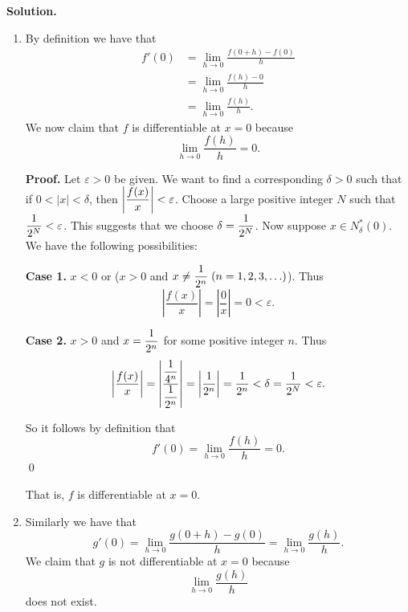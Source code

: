 \begin{enumerate}
      \textbf{Solution.}

      \begin{enumerate}
         \item By definition we have that
               \begin{align*}
                  f'(0) &= \lim_{h \to 0}\frac{f(0 + h) - f(0)}{h} \\
                        &= \lim_{h \to 0}\frac{f(h) - 0}{h} \\
                        &= \lim_{h \to 0}\frac{f(h)}{h}.
               \end{align*}
               We now claim that $f$ is differentiable at $x = 0$ because
               $$\lim_{h \to 0}\frac{f(h)}{h} = 0.$$

               \textbf{Proof.} Let $\varepsilon > 0$ be given. We want to find
               a corresponding $\delta > 0$ such that if $0 < |x| < \delta$,
               then $\left|\displaystyle\frac{f(x)}{x}\right| < \varepsilon$. Choose a 
               large positive integer $N$ such that
               $\displaystyle\frac{1}{2^N} < \varepsilon$. This suggests that we choose
               $\delta = \displaystyle\frac{1}{2^N}$. Now suppose $x \in N^*_\delta(0)$. We
               have the following possibilities:

               \textbf{Case 1.} $x < 0$ or ($x > 0$ and
               $x \neq \displaystyle\frac{1}{2^n} \; (n = 1, 2, 3, \ldots)$). Thus
               $$\left|\frac{f(x)}{x}\right| = \left|\frac{0}{x}\right| =
                 0 < \varepsilon.$$

               \textbf{Case 2.} $x > 0$ and
               $x = \displaystyle\frac{1}{2^n}$ for some positive integer $n$. Thus
               $$\left|\frac{f(x)}{x}\right| =
                 \left|\frac{\displaystyle\frac{1}{4^n}}{\displaystyle\frac{1}{2^n}}\right| =
                 \left|\frac{1}{2^n}\right| = \frac{1}{2^n} < \delta =
                 \frac{1}{2^N} < \varepsilon.$$

               So it follows by definition that
               $$f'(0) = \lim_{h \to 0}\frac{f(h)}{h} = 0.$$
               \qed

               That is, $f$ is differentiable at $x = 0$.
         \item Similarly we have that
               $$g'(0) = \lim_{h \to 0}\frac{g(0 + h) - g(0)}{h} =
                 \lim_{h \to 0}\frac{g(h)}{h}.$$
               We claim that $g$ is not differentiable at $x = 0$ because
               $$\lim_{h \to 0}\frac{g(h)}{h}$$
               does not exist.


\end{enumerate}
\end{enumerate}
